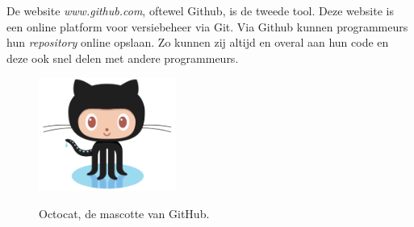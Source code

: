 De website \textit{www.github.com}, oftewel Github, is de tweede tool.
Deze website is een online platform voor versiebeheer via Git. Via Github kunnen programmeurs hun \textit{repository} online opslaan.\cite{git:hello_world} Zo kunnen zij altijd en overal aan hun code en deze ook snel delen met andere programmeurs.

\begin{figure}[ht]
    \centering
    \includegraphics[width=0.4\textwidth]{illustraties/Octocat}
    \caption{Octocat, de mascotte van GitHub.}
    \cite{git:github}
    \label{fig:octocat}
\end{figure}

